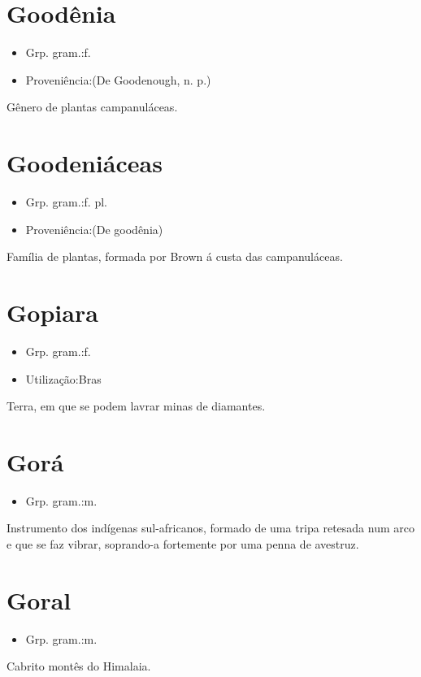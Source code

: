 \section{Goodênia}
\begin{itemize}
\item {Grp. gram.:f.}
\end{itemize}
\begin{itemize}
\item {Proveniência:(De \textunderscore Goodenough\textunderscore , n. p.)}
\end{itemize}
Gênero de plantas campanuláceas.
\section{Goodeniáceas}
\begin{itemize}
\item {Grp. gram.:f. pl.}
\end{itemize}
\begin{itemize}
\item {Proveniência:(De \textunderscore goodênia\textunderscore )}
\end{itemize}
Família de plantas, formada por Brown á custa das campanuláceas.
\section{Gopiara}
\begin{itemize}
\item {Grp. gram.:f.}
\end{itemize}
\begin{itemize}
\item {Utilização:Bras}
\end{itemize}
Terra, em que se podem lavrar minas de diamantes.
\section{Gorá}
\begin{itemize}
\item {Grp. gram.:m.}
\end{itemize}
Instrumento dos indígenas sul-africanos, formado de uma tripa retesada num arco e que se faz vibrar, soprando-a fortemente por uma penna de avestruz.
\section{Goral}
\begin{itemize}
\item {Grp. gram.:m.}
\end{itemize}
Cabrito montês do Himalaia.

